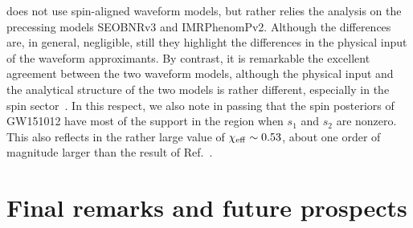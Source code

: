 does not use spin-aligned waveform models, but rather relies the analysis on 
the precessing models SEOBNRv3 and IMRPhenomPv2. Although the differences 
are, in general, negligible, still they highlight the differences in the physical input of 
the waveform approximants. By contrast, it is remarkable the excellent agreement between the
two waveform models, although the physical input and the analytical structure of the
two models is rather different, especially in the spin sector~\cite{Rettegno:2019tzh}.
In this respect, we also note in passing that the spin posteriors of GW151012 have
most of the support in the region when $s_1$ and $s_2$ are nonzero. This also
reflects in the rather large value of $\chi_{\rm eff}\sim 0.53$, about one order of magnitude
larger than the result of Ref.~\cite{LIGOScientific:2018mvr}.

\section{Final remarks and future prospects}
\label{sec:end}


